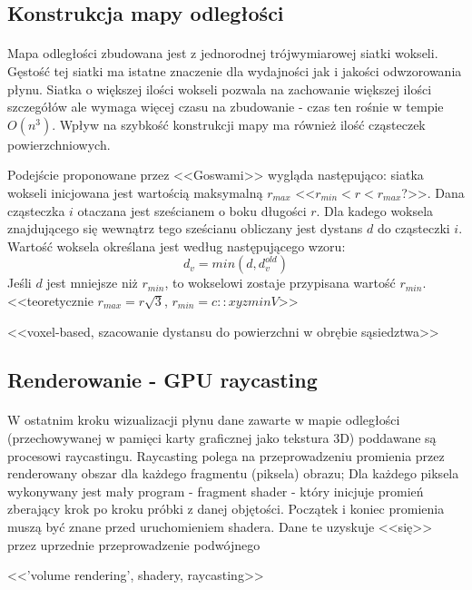 \subsection{Konstrukcja mapy odległości}

\paragraph{}
Mapa odległości zbudowana jest z jednorodnej trójwymiarowej siatki wokseli. Gęstość tej siatki ma istatne znaczenie dla wydajności jak i jakości odwzorowania płynu. Siatka o większej ilości wokseli pozwala na zachowanie większej ilości szczegółów ale wymaga więcej czasu na zbudowanie - czas ten rośnie w tempie $O(n^3)$. Wpływ na szybkość konstrukcji mapy ma również ilość cząsteczek powierzchniowych.
\par
Podejście proponowane przez <<Goswami>> wygląda następująco: siatka wokseli inicjowana jest wartością maksymalną $r_{max}$ <<$r_{min}< r < r_{max}$?>>. Dana cząsteczka $i$ otaczana jest sześcianem o boku długości $r$. Dla kadego woksela znajdującego się wewnątrz tego sześcianu obliczany jest dystans $d$ do cząsteczki $i$. Wartość woksela określana jest według następującego wzoru:
\begin{equation}
d_v = min(d, d_v^{old})
\label{eqn:distance_field}
\end{equation}
Jeśli $d$ jest mniejsze niż $r_{min}$, to wokselowi zostaje przypisana wartość $r_{min}$. <<teoretycznie $r_{max} = r\sqrt{3}$, $r_{min} = c::xyzminV$>>
\par
<<voxel-based, szacowanie dystansu do powierzchni w obrębie sąsiedztwa>>
\par


\subsection{Renderowanie - GPU raycasting}

\paragraph{}
W ostatnim kroku wizualizacji płynu dane zawarte w mapie odległości (przechowywanej w pamięci karty graficznej jako tekstura 3D) poddawane są procesowi raycastingu. Raycasting polega na przeprowadzeniu promienia przez renderowany obszar dla każdego fragmentu (piksela) obrazu; Dla każdego piksela wykonywany jest mały program - fragment shader - który inicjuje promień zberający krok po kroku próbki z danej objętości. Początek i koniec promienia muszą być znane przed uruchomieniem shadera. Dane te uzyskuje <<się>> przez uprzednie przeprowadzenie podwójnego 
\par
<<'volume rendering', shadery, raycasting>>
\par